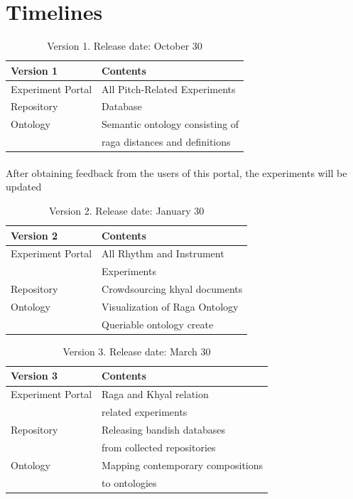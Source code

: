\documentclass{tufte-handout}
\begin{document}
\section{Timelines}


\begin{table}[h]
\begin{tabular}{ll}
\toprule
Version 1                    & Contents      \\
\midrule
Experiment Portal              & All Pitch-Related Experiments\\
Repository                     & Database\\
Ontology & Semantic ontology consisting of\\ 
 & raga distances and definitions\\
\bottomrule    
\end{tabular}
\caption{Version 1. Release date: October 30}
\end{table}

\paragraph*{}
After obtaining feedback from the users of this portal, the experiments will be updated

\begin{table}[h]
\begin{tabular}{ll}
\toprule
Version 2                    & Contents      \\
\midrule
Experiment Portal & All Rhythm and Instrument\\ & Experiments\\
Repository & Crowdsourcing khyal documents\\
Ontology & Visualization of Raga Ontology\\
& Queriable ontology create\\
\bottomrule    
\end{tabular}
\caption{Version 2. Release date: January 30}
\end{table}


\begin{table}[h]
\begin{tabular}{ll}
\toprule
Version 3                    & Contents      \\
\midrule
Experiment Portal              & Raga and Khyal relation\\
& related experiments\\
Repository                     & Releasing bandish databases\\
& from collected repositories\\
Ontology & Mapping contemporary compositions\\
 & to ontologies\\
\bottomrule    
\end{tabular}
\caption{Version 3. Release date: March 30}
\end{table}
\end{document}
